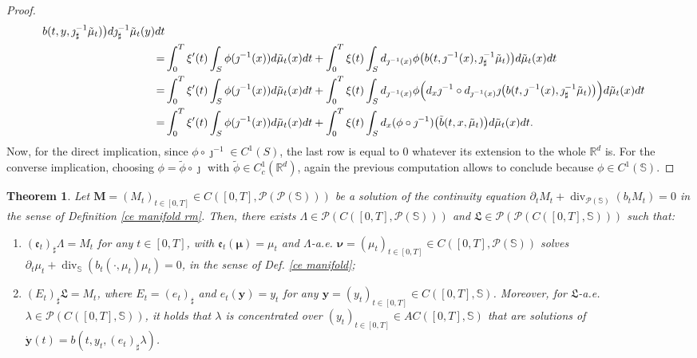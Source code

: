 \documentclass[10pt,leqno]{amsart}
\numberwithin{equation}{section}
\newtheorem{teorema}{Theorem}[section]
\newcommand{\R}{\mathbb{R}}
\newcommand{\PP}{\mathcal{P}}
\newcommand{\Ss}{\mathbb{S}}
\begin{document}
\begin{proof}
\begin{align*}
    b(t,y,\jmath^{-1}_\sharp\tilde\mu_t) \big) d\jmath^{-1}_\sharp\tilde\mu_t(y) dt
    \\
    = & 
     \int_0^T \xi'(t) \int_{S} \phi(\jmath^{-1}(x)) d\tilde\mu_t(x) dt + \int_0^T \xi(t) \int_{S} d_{\jmath^{-1}(x)}\phi\big( 
    b(t,\jmath^{-1}(x),\jmath^{-1}_\sharp\tilde\mu_t) \big) d\tilde\mu_t(x) dt
    \\
    = & 
    \int_0^T \xi'(t) \int_{S} \phi(\jmath^{-1}(x)) d\tilde\mu_t(x) dt + \int_0^T \xi(t) \int_{S} d_{\jmath^{-1}(x)}\phi\Big( d_x\jmath^{-1} \circ d_{\jmath^{-1}(x)}\jmath\big(
    b(t,\jmath^{-1}(x),\jmath^{-1}_\sharp\tilde\mu_t) \big)\Big) d\tilde\mu_t(x) dt
    \\
    = & 
    \int_0^T \xi'(t) \int_{S} \phi(\jmath^{-1}(x)) d\tilde\mu_t(x) dt + \int_0^T \xi(t) \int_{S} d_{x}(\phi\circ \jmath^{-1})\big(
    \Tilde{b}(t,x,\tilde\mu_t) \big) d\tilde\mu_t(x) dt.
\end{align*}
Now, for the direct implication, since $\phi \circ \jmath^{-1} \in C^1(S)$, the last row is equal to $0$ whatever its extension to the whole $\R^d$ is. For the converse implication, choosing $\phi = \tilde{\phi}\circ \jmath$ with $\tilde{\phi} \in C_c^1(\R^d)$, again the previous computation allows to conclude because $\phi \in C^1(\Ss)$. 
\end{proof}


\begin{teorema}\label{superposition for manifolds}
    Let $\boldsymbol{M}=(M_t)_{t\in [0,T]}\in C([0,T],\PP(\PP(\Ss)))$ be a solution of the continuity equation $\partial_tM_t + \operatorname{div}_{\PP(\Ss)}(b_tM_t)=0$ in the sense of Definition \ref{ce manifold rm}. Then, there exists $\Lambda\in \PP(C([0,T],\PP(\Ss)))$ and $\mathfrak{L}\in \PP(\PP(C([0,T],\Ss)))$ such that:
    \begin{enumerate}
        \item\label{prop of Lambda} $(\mathfrak{e}_t)_{\sharp}\Lambda = M_t$ for any $t\in [0,T]$, with $\mathfrak{e}_t(\boldsymbol{\mu}) = \mu_t$ and $\Lambda$-a.e. $\boldsymbol{\nu} = (\mu_t)_{t\in[0,T]}\in C([0,T],\PP(\Ss))$ solves $\partial_t\mu_t + \operatorname{div}_\Ss(b_t(\cdot,\mu_t)\mu_t)=0$, in the sense of Def. \ref{ce manifold};
        \item\label{prop of mathfrak L} $(E_t)_\sharp\mathfrak{L}=M_t$, where $E_t=(e_t)_\sharp$ and $e_t(\boldsymbol{y}) = y_t$ for any $\boldsymbol{y}=(y_t)_{t\in [0,T]}\in C([0,T],\Ss)$. Moreover, for $\mathfrak{L}$-a.e. $\lambda\in \PP(C([0,T],\Ss))$, it holds that $\lambda$ is concentrated over $(y_t)_{t\in[0,T]}\in AC([0,T],\Ss)$ that are solutions of $\dot{\boldsymbol{y}}(t) = b(t,y_t,(e_t)_\sharp\lambda)$.
    \end{enumerate}
\end{teorema}
\end{document}

